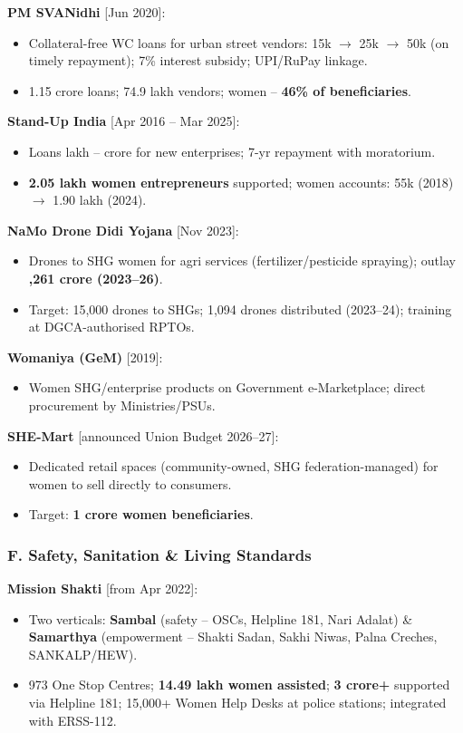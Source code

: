 \textbf{PM SVANidhi} [Jun 2020]:
\begin{itemize}
  \item Collateral-free WC loans for urban street vendors: \rupee15k $\rightarrow$ \rupee25k $\rightarrow$ \rupee50k (on timely repayment); 7\% interest subsidy; UPI/RuPay linkage.
  \item 1.15 crore loans; 74.9 lakh vendors; women -- \textbf{46\% of beneficiaries}.
\end{itemize}

\textbf{Stand-Up India} [Apr 2016 -- Mar 2025]:
\begin{itemize}
  \item Loans  lakh --  crore for new enterprises; 7-yr repayment with moratorium.
  \item \textbf{2.05 lakh women entrepreneurs} supported; women accounts: 55k (2018) $\rightarrow$ 1.90 lakh (2024).
\end{itemize}

\textbf{NaMo Drone Didi Yojana} [Nov 2023]:
\begin{itemize}
  \item Drones to SHG women for agri services (fertilizer/pesticide spraying); outlay \textbf{,261 crore (2023--26)}.
  \item Target: 15,000 drones to SHGs; 1,094 drones distributed (2023--24); training at DGCA-authorised RPTOs.
\end{itemize}

\textbf{Womaniya (GeM)} [2019]:
\begin{itemize}
  \item Women SHG/enterprise products on Government e-Marketplace; direct procurement by Ministries/PSUs.
\end{itemize}

\textbf{SHE-Mart} [announced Union Budget 2026--27]:
\begin{itemize}
  \item Dedicated retail spaces (community-owned, SHG federation-managed) for women to sell directly to consumers.
  \item Target: \textbf{1 crore women beneficiaries}.
\end{itemize}

\subsubsection*{F. Safety, Sanitation \& Living Standards}

\textbf{Mission Shakti} [from Apr 2022]:
\begin{itemize}
  \item Two verticals: \textbf{Sambal} (safety -- OSCs, Helpline 181, Nari Adalat) \& \textbf{Samarthya} (empowerment -- Shakti Sadan, Sakhi Niwas, Palna Creches, SANKALP/HEW).
  \item 973 One Stop Centres; \textbf{14.49 lakh women assisted}; \textbf{3 crore+} supported via Helpline 181; 15,000+ Women Help Desks at police stations; integrated with ERSS-112.
\end{itemize}

